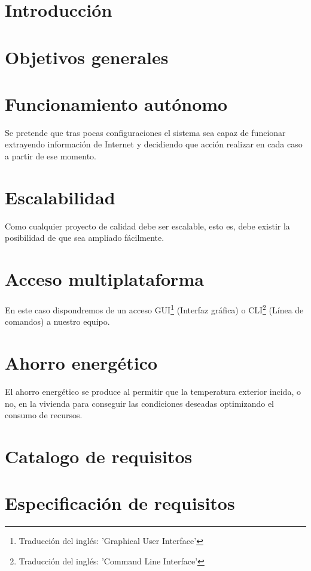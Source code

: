 
\section{Introducción}

\section{Objetivos generales}

\section{Funcionamiento autónomo}
Se pretende que tras pocas configuraciones el sistema sea capaz de funcionar extrayendo información de Internet y decidiendo que acción realizar en cada caso a partir de ese momento.

\section{Escalabilidad}
Como cualquier proyecto de calidad debe ser escalable, esto es, debe existir la posibilidad de que sea ampliado fácilmente.

\section{Acceso multiplataforma}
En este caso dispondremos de un acceso GUI\footnote{Traducción del inglés: 'Graphical User Interface'} (Interfaz gráfica) o CLI\footnote{Traducción del inglés: 'Command Line Interface'} (Línea de comandos) a nuestro equipo.

\section{Ahorro energético}
El ahorro energético se produce al permitir que la temperatura exterior incida, o no, en la vivienda para conseguir las condiciones deseadas optimizando el consumo de recursos.



\section{Catalogo de requisitos}

\section{Especificación de requisitos}


